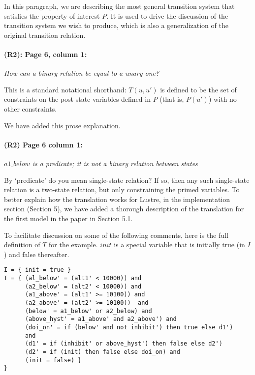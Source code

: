 \documentclass{article}
\begin{document}
\noindent In this paragraph, we are describing the most general transition system that satisfies the property of interest $P$.  It is used to drive the discussion of the transition system we wish to produce, which is also a generalization of the original transition relation.

\paragraph{(R2): Page 6, column 1:} \textit{How can a binary relation be equal to a unary
one?}
\vspace{0.05in}

\noindent This is a standard notational shorthand: $T(u, u')$ is defined to be the set of constraints on the post-state variables defined in $P$ (that
is, $P(u')$) with no other constraints.

We have added this prose explanation.

\paragraph{(R2) Page 6 column 1:} \textit{$a1\_below$ is a predicate; it is not a binary
relation between states}
\vspace{0.05in}

\noindent By `predicate' do you mean single-state relation? If so, then
any such single-state relation is a two-state relation, but only constraining the primed variables.  To better explain how the translation works for Lustre, in the implementation section (Section 5), we have added a thorough description of the translation for the first model in the paper in Section 5.1.

To facilitate discussion on some of the following comments, here is the
full definition of $T$ for the example. $init$ is a special
variable that is initially true (in $I$) and false thereafter.

\begin{verbatim}
I = { init = true }
T = { (al_below' = (alt1' < 10000)) and
      (a2_below' = (alt2' < 10000)) and
      (a1_above' = (alt1' >= 10100)) and
      (a2_above' = (alt2' >= 10100))  and
      (below' = a1_below' or a2_below) and
      (above_hyst' = a1_above' and a2_above') and
      (doi_on' = if (below' and not inhibit') then true else d1')
      and
      (d1' = if (inhibit' or above_hyst') then false else d2')
      (d2' = if (init) then false else doi_on) and
      (init = false) }
}
\end{verbatim}
\end{document}
